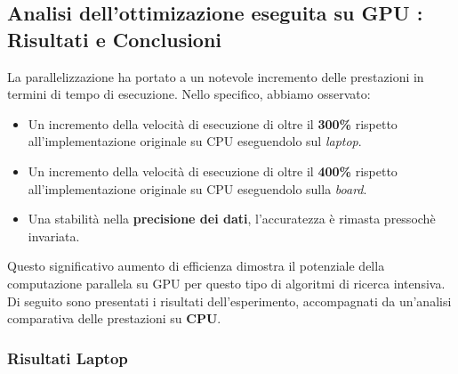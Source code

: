\documentclass[12pt,a4paper]{report}
\begin{document}
\subsection{Analisi dell'ottimizazione eseguita su GPU : Risultati e Conclusioni}

La parallelizzazione ha portato a un notevole incremento delle prestazioni in termini di tempo di esecuzione. Nello specifico, abbiamo osservato:
\begin{itemize}
\item Un incremento della velocità di esecuzione di oltre il \textbf{300\% }rispetto all'implementazione originale su CPU eseguendolo sul \textit{laptop}.
\item Un incremento della velocità di esecuzione di oltre il \textbf{400\% }rispetto all'implementazione originale su CPU eseguendolo sulla \textit{board}.
\item Una stabilità nella \textbf{precisione dei dati}, l'accuratezza è rimasta pressochè invariata.
\end{itemize}
Questo significativo aumento di efficienza dimostra il potenziale della computazione parallela su GPU per questo tipo di algoritmi di ricerca intensiva.
Di seguito sono presentati i risultati dell'esperimento, accompagnati da un'analisi comparativa delle prestazioni su \textbf{CPU}.

\subsubsection{Risultati Laptop}

\end{document}
